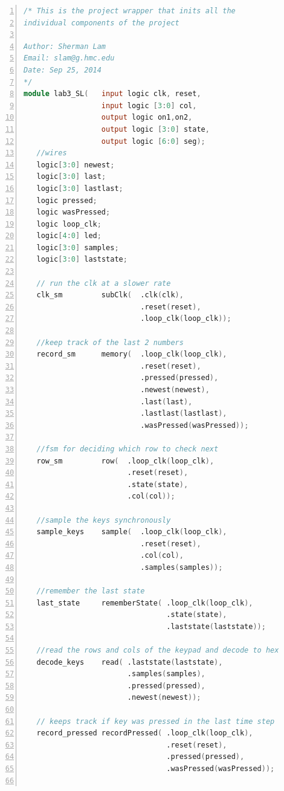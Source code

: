 \documentclass[11pt]{article}
\begin{document}
\begin{lstlisting}[language=Verilog,numbers=left,basicstyle=\footnotesize]
/* This is the project wrapper that inits all the
individual components of the project

Author: Sherman Lam
Email: slam@g.hmc.edu
Date: Sep 25, 2014
*/
module lab3_SL(   input logic clk, reset,
                  input logic [3:0] col,
                  output logic on1,on2,
                  output logic [3:0] state,
                  output logic [6:0] seg);
   //wires
   logic[3:0] newest;
   logic[3:0] last;
   logic[3:0] lastlast;
   logic pressed;
   logic wasPressed;
   logic loop_clk;
   logic[4:0] led;
   logic[3:0] samples;
   logic[3:0] laststate;
   
   // run the clk at a slower rate
   clk_sm         subClk(  .clk(clk),
                           .reset(reset),
                           .loop_clk(loop_clk));  
   
   //keep track of the last 2 numbers
   record_sm      memory(  .loop_clk(loop_clk),
                           .reset(reset),
                           .pressed(pressed),
                           .newest(newest),
                           .last(last),
                           .lastlast(lastlast),
                           .wasPressed(wasPressed));
   
   //fsm for deciding which row to check next
   row_sm         row(  .loop_clk(loop_clk),
                        .reset(reset),
                        .state(state),
                        .col(col));
   
   //sample the keys synchronously
   sample_keys    sample(  .loop_clk(loop_clk),
                           .reset(reset),
                           .col(col),
                           .samples(samples));
   
   //remember the last state
   last_state     rememberState( .loop_clk(loop_clk),
                                 .state(state),
                                 .laststate(laststate));
   
   //read the rows and cols of the keypad and decode to hex
   decode_keys    read( .laststate(laststate),
                        .samples(samples),
                        .pressed(pressed),
                        .newest(newest));

   // keeps track if key was pressed in the last time step
   record_pressed recordPressed( .loop_clk(loop_clk),
                                 .reset(reset),
                                 .pressed(pressed),
                                 .wasPressed(wasPressed));
   

\end{lstlisting}
\end{document}
